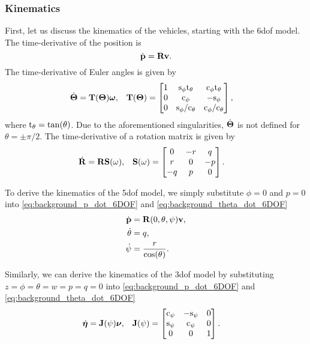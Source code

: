 \subsubsection*{Kinematics}
First, let us discuss the kinematics of the vehicles, starting with the 6\gls{dof} model.
The time-derivative of the position is
\begin{equation}
    \dot{\mathbf{p}} = \mathbf{R} \mathbf{v}.
    \label{eq:background_p_dot_6DOF}
\end{equation}
The time-derivative of Euler angles is given by \cite{fossen_handbook_2011}
\begin{align}
    \dot{\bm{\Theta}} &= \mathbf{T}(\bm{\Theta}) \bm{\omega}, &
    \mathbf{T}(\bm{\Theta}) &= 
    \begin{bmatrix}
        1 & {\rm s}_{\phi}{\rm t}_{\theta} & {\rm c}_{\phi}{\rm t}_{\theta} \\ 0 & {\rm c}_{\phi} & -{\rm s}_{\phi} \\ 0 & {\rm s}_{\phi}/{\rm c}_{\theta} & {\rm c}_{\phi}/{\rm c}_{\theta}
    \end{bmatrix},
    \label{eq:background_theta_dot_6DOF}
\end{align}
where ${\rm t}_{\theta} = \tan(\theta)$.
Due to the aforementioned singularities, $\dot{\bm{\Theta}}$ is not defined for $\theta = \pm \pi/2$.
The time-derivative of a rotation matrix is given by
\begin{align}
    \dot{\mathbf{R}} &= \mathbf{R} \mathbf{S}(\omega), &
    \mathbf{S}(\omega) &=
    \begin{bmatrix}
        0 & -r & q\\ r & 0 & -p\\ -q & p & 0
    \end{bmatrix}.
\end{align}

To derive the kinematics of the 5\gls{dof} model, we simply substitute $\phi = 0$ and $p = 0$ into \eqref{eq:background_p_dot_6DOF} and \eqref{eq:background_theta_dot_6DOF}
\begin{subequations}
    \begin{align}
        \dot{\mathbf{p}} &= \mathbf{R}(0, \theta, \psi) \mathbf{v}, \\
        \dot{\theta} &= q, \\
        \dot{\psi} &= \frac{r}{\cos(\theta)}.
    \end{align}
\end{subequations}

Similarly, we can derive the kinematics of the 3\gls{dof} model by substituting $z = \phi = \theta = w = p = q = 0$ into \eqref{eq:background_p_dot_6DOF} and \eqref{eq:background_theta_dot_6DOF}
\begin{align}
    \dot{\bm{\eta}} &= \mathbf{J}(\psi) \bm{\nu}, &
    \mathbf{J}(\psi) &=
    \begin{bmatrix}
        {\rm c}_{\psi} & -{\rm s}_{\psi} & 0 \\
        {\rm s}_{\psi} & {\rm c}_{\psi} & 0 \\
        0 & 0 & 1
    \end{bmatrix}.
\end{align}

